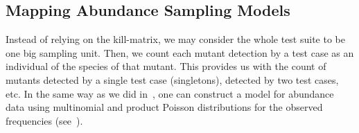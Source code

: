 \documentclass[sigconf,review,anonymous]{acmart}
\begin{document}
\subsection{Mapping Abundance Sampling Models}
Instead of relying on the kill-matrix, we may consider the whole test suite to be one big sampling unit.
%
Then, we count each mutant detection by a test case as an individual of the species of that mutant.
%
This provides us with the count
of mutants detected by a single test case (singletons), detected by
two test cases, etc. 
%
In the same way as we did in~, one can construct
a model for abundance data using multinomial and product 
Poisson distributions for the observed frequencies (see~\cite{chao2016species}).

%
%
%



\end{document}
